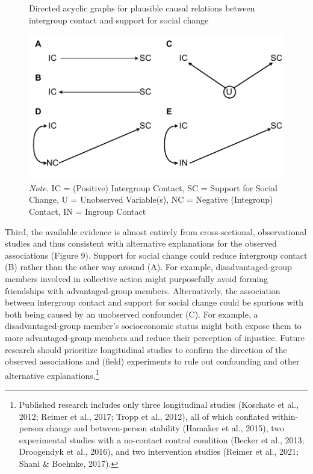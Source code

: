 \documentclass[twocolumn, 11pt, letterpaper]{article}
\begin{document}
\begin{figure}
\centering
\caption{Directed acyclic graphs for plausible causal relations between intergroup contact and support for social change}
\includegraphics[scale=1]{../figures/figure-9}
\caption*{\textit{Note.} IC = (Positive) Intergroup Contact, SC = Support for Social Change, U = Unobserved Variable(s), NC = Negative (Integroup) Contact, IN = Ingroup Contact}
\label{fig:f9}
\end{figure}

Third, the available evidence is almost entirely from cross-sectional,
observational studies and thus consistent with alternative explanations
for the observed associations (Figure 9). Support for social change
could reduce intergroup contact (B) rather than the other way around
(A). For example, disadvantaged-group members involved in collective
action might purposefully avoid forming friendships with
advantaged-group members. Alternatively, the association between
intergroup contact and support for social change could be spurious with
both being caused by an unobserved confounder (C). For example, a
disadvantaged-group member's socioeconomic status might both expose them
to more advantaged-group members and reduce their perception of
injustice. Future research should prioritize longitudinal studies to
confirm the direction of the observed associations and (field)
experiments to rule out confounding and other alternative
explanations.\footnote{Published research includes only three
  longitudinal studies (Koschate et al., 2012; Reimer et al., 2017;
  Tropp et al., 2012), all of which conflated within-person change and
  between-person stability (Hamaker et al., 2015), two experimental
  studies with a no-contact control condition (Becker et al., 2013;
  Droogendyk et al., 2016), and two intervention studies (Reimer et al.,
  2021; Shani \& Boehnke, 2017).}
\end{document}
